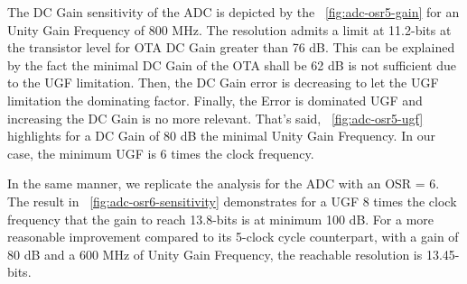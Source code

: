 The DC Gain sensitivity of the ADC is depicted by the \figurename~\ref{fig:adc-osr5-gain} for an Unity Gain Frequency of 800 MHz. The resolution admits a limit at 11.2-bits at the transistor level for OTA DC Gain greater than 76 dB. This can be explained by the fact the minimal DC Gain of the OTA shall be 62 dB is not sufficient due to the UGF limitation. Then, the DC Gain error is decreasing to let the UGF limitation the dominating factor. Finally, the Error is dominated UGF and increasing the DC Gain is no more relevant.
That's said, \figurename~\ref{fig:adc-osr5-ugf} highlights for a DC Gain of 80 dB the minimal Unity Gain Frequency. In our case, the minimum UGF is 6 times the clock frequency.

In the same manner, we replicate the analysis for the ADC with an OSR = 6. The result in \figurename~\ref{fig:adc-osr6-sensitivity} demonstrates for a UGF 8 times the clock frequency that the gain to reach 13.8-bits is at minimum 100 dB. For a more reasonable improvement compared to its 5-clock cycle counterpart, with a gain of 80 dB and a 600 MHz of Unity Gain Frequency, the reachable resolution is 13.45-bits.
